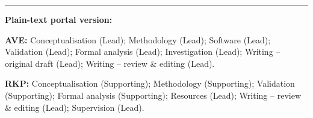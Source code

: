 \documentclass[11pt,a4paper]{article}
\begin{document}
\bigskip\noindent\rule{0.5\textwidth}{0.4pt}

\bigskip\noindent\textbf{Plain-text portal version:}

\medskip\begin{minipage}{\textwidth}\small
\textbf{AVE:} Conceptualisation (Lead); Methodology (Lead); Software (Lead);
Validation (Lead); Formal analysis (Lead); Investigation (Lead);
Writing -- original draft (Lead); Writing -- review \& editing (Lead).

\medskip\textbf{RKP:} Conceptualisation (Supporting); Methodology (Supporting);
Validation (Supporting); Formal analysis (Supporting); Resources (Lead);
Writing -- review \& editing (Lead); Supervision (Lead).
\end{minipage}
\end{document}

